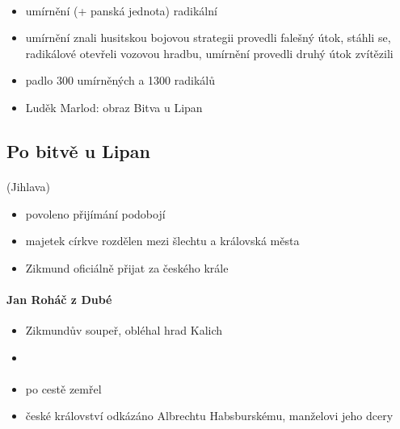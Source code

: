 \paragraph{}
\begin{itemize}
\item umírnění (+ panská jednota) \x radikální
\item umírnění znali husitskou bojovou strategii \ra provedli falešný útok, stáhli se, radikálové otevřeli vozovou hradbu, umírnění provedli druhý útok \ra zvítězili
\item padlo 300 umírněných a 1300 radikálů
\item Luděk Marlod: obraz Bitva u Lipan
\end{itemize}

\subsection{Po bitvě u Lipan}
\paragraph{} (Jihlava)
\begin{itemize}
\item povoleno přijímání podobojí
\item majetek církve rozdělen mezi šlechtu a královská města
\item Zikmund oficiálně přijat za českého krále
\end{itemize}

\paragraph{Jan Roháč z Dubé}
\begin{itemize}
\item Zikmundův soupeř, obléhal hrad Kalich
\item {}
\end{itemize}

\paragraph{}
\begin{itemize}
\item po cestě zemřel
\item české království odkázáno Albrechtu Habsburskému, manželovi jeho dcery
\end{itemize}

